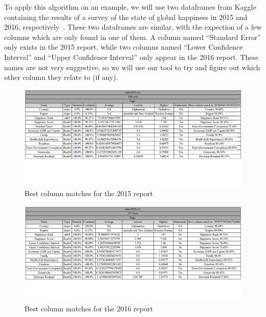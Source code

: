 To apply this algorithm on an example, we will use two dataframes from Kaggle containing the results of a survey of the
state of global happiness in 2015 and 2016, respectively~\cite{kaggleWorldHappinessReport}.
These two dataframes are similar, with the expection of a few columns which are only found in one of them.
A column named ``Standard Error'' only exists in the 2015 report, while two columns named ``Lower Confidence Interval'' and
``Upper Confidence Interval'' only appear in the 2016 report.
These names are not very suggestive, so we will use our tool to try and figure out which other column they relate to (if any).

\begin{figure}[h]
    \centering
    \includegraphics[width=12cm]{figures/best_column_match_id/2015_column_match}
    \caption{Best column matches for the 2015 report}
    \label{fig:2015_column_match}
\end{figure}

\begin{figure}[h]
    \centering
    \includegraphics[width=12cm]{figures/best_column_match_id/2016_column_match}
    \caption{Best column matches for the 2016 report}
    \label{fig:2016_column_match}
\end{figure}

